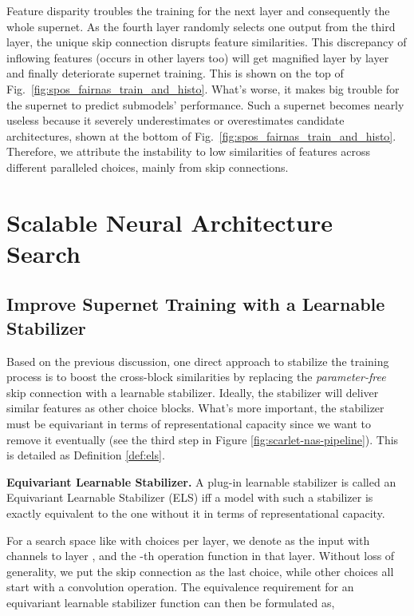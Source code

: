\documentclass[runningheads]{llncs}
\begin{document}
Feature disparity troubles the training for the next layer and consequently the whole supernet. As the fourth layer randomly selects one output from the third layer, the unique skip connection disrupts feature similarities. This discrepancy of inflowing features (occurs in other layers too) will get magnified layer by layer and finally deteriorate supernet training. This is shown on the top of Fig.~\ref{fig:spos_fairnas_train_and_histo}. What's worse, it makes big trouble for the supernet to predict submodels' performance. Such a supernet becomes nearly useless because it severely underestimates or overestimates candidate architectures, shown at the bottom of Fig.~\ref{fig:spos_fairnas_train_and_histo}. Therefore, we attribute the instability to low similarities of features across different paralleled choices, mainly from skip connections. 

\section{Scalable Neural Architecture Search}
\subsection{Improve Supernet Training with a Learnable Stabilizer}
Based on the previous discussion, one direct approach to stabilize the training process is to boost the cross-block similarities by replacing the \emph{parameter-free} skip connection with a learnable stabilizer. Ideally, the stabilizer will deliver similar features as other choice blocks. What's more important, the stabilizer must be equivariant in terms of representational capacity since we want to remove it eventually (see the third step in Figure \ref{fig:scarlet-nas-pipeline}). This is detailed as Definition \ref{def:els}.

\begin{definition}\label{def:els}
\textbf{Equivariant Learnable Stabilizer.}
A plug-in learnable stabilizer is called an Equivariant Learnable Stabilizer (ELS) iff a model with such a stabilizer is exactly equivalent to the one without it in terms of representational capacity.
\end{definition}

For a search space  like  with  choices per layer,  we denote  as the input with  channels to layer , and  the -th operation function in that layer. Without loss of generality, we put the skip connection as the last choice, while other choices all start with a convolution operation. The equivalence requirement for an equivariant learnable stabilizer function  can then be formulated as, 
\end{document}
